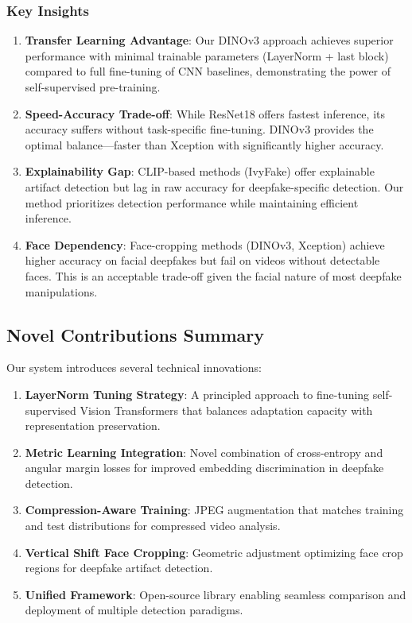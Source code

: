 \documentclass[11pt,a4paper]{article}
\begin{document}
\subsubsection{Key Insights}

\begin{enumerate}
    \item \textbf{Transfer Learning Advantage}: Our DINOv3 approach achieves superior performance with minimal trainable parameters (LayerNorm + last block) compared to full fine-tuning of CNN baselines, demonstrating the power of self-supervised pre-training.
    
    \item \textbf{Speed-Accuracy Trade-off}: While ResNet18 offers fastest inference, its accuracy suffers without task-specific fine-tuning. DINOv3 provides the optimal balance---faster than Xception with significantly higher accuracy.
    
    \item \textbf{Explainability Gap}: CLIP-based methods (IvyFake) offer explainable artifact detection but lag in raw accuracy for deepfake-specific detection. Our method prioritizes detection performance while maintaining efficient inference.
    
    \item \textbf{Face Dependency}: Face-cropping methods (DINOv3, Xception) achieve higher accuracy on facial deepfakes but fail on videos without detectable faces. This is an acceptable trade-off given the facial nature of most deepfake manipulations.
\end{enumerate}

\subsection{Novel Contributions Summary}

Our system introduces several technical innovations:

\begin{enumerate}
    \item \textbf{LayerNorm Tuning Strategy}: A principled approach to fine-tuning self-supervised Vision Transformers that balances adaptation capacity with representation preservation.
    
    \item \textbf{Metric Learning Integration}: Novel combination of cross-entropy and angular margin losses for improved embedding discrimination in deepfake detection.
    
    \item \textbf{Compression-Aware Training}: JPEG augmentation that matches training and test distributions for compressed video analysis.
    
    \item \textbf{Vertical Shift Face Cropping}: Geometric adjustment optimizing face crop regions for deepfake artifact detection.
    
    \item \textbf{Unified Framework}: Open-source library enabling seamless comparison and deployment of multiple detection paradigms.
\end{enumerate}
\end{document}
